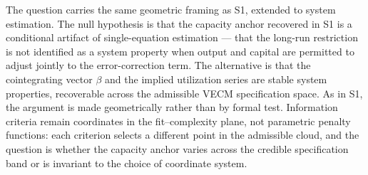 \documentclass[11pt,a4paper]{article}
\begin{document}
The question carries the same geometric framing as S1, extended to system
estimation. The null hypothesis is that the capacity anchor recovered in S1
is a conditional artifact of single-equation estimation --- that the long-run
restriction is not identified as a system property when output and capital
are permitted to adjust jointly to the error-correction term. The alternative
is that the cointegrating vector $\beta$ and the implied utilization series
are stable system properties, recoverable across the admissible VECM
specification space. As in S1, the argument is made geometrically rather than
by formal test. Information criteria remain coordinates in the
fit--complexity plane, not parametric penalty functions: each criterion
selects a different point in the admissible cloud, and the question is
whether the capacity anchor varies across the credible specification band or
is invariant to the choice of coordinate system.

\end{document}
